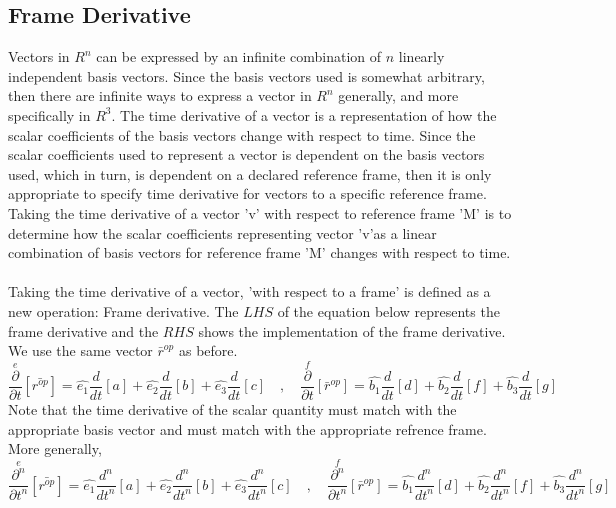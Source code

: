 \documentclass[class=report, 12pt, crop=false]{standalone}
\begin{document}
\begin{center}
\section{Frame Derivative}
\begin{comment}
\end{comment}
Vectors in $R^{n}$ can be expressed by an infinite combination of $n$ linearly independent basis vectors. Since the basis vectors used is somewhat arbitrary, then there are infinite ways to express a vector in $R^{n}$ generally, and more specifically in $R^{3}$. The time derivative of a vector is a representation of how the scalar coefficients of the basis vectors change with respect to time. Since the scalar coefficients used to represent a vector is dependent on the basis vectors used, which in turn, is dependent on a declared reference frame, then it is only appropriate to specify time derivative for vectors to a specific reference frame. Taking the time derivative of a vector 'v' with respect to reference frame 'M' is to determine how the scalar coefficients representing vector 'v'as a linear combination of basis vectors for reference frame 'M' changes with respect to time.
\\~\\Taking the time derivative of a vector, 'with respect to a frame' is defined as a new operation: Frame derivative. The $LHS$ of the equation below represents the frame derivative and the $RHS$ shows the implementation of the frame derivative. We use the same vector $\bar{r}^{op}$ as before.
$$\overset{e}{\frac{\partial}{\partial t}}[\bar{{r}^{op}}] = \hat{e_{1}}\frac{d}{d t}[a] + \hat{e_{2}}\frac{d}{d t}[b] + \hat{e_{3}}\frac{d}{d t}[c] \quad,\quad \overset{f}{\frac{\partial}{\partial t}}[\bar{r}^{op}] = \hat{b_{1}}\frac{d}{d t}[d] + \hat{b_{2}}\frac{d}{d t}[f] + \hat{b_{3}}\frac{d}{d t}[g]$$
Note that the time derivative of the scalar quantity must match with the appropriate basis vector and must match with the appropriate refrence frame. More generally,
$$\overset{e}{\frac{\partial^n}{\partial t^n}}[\bar{{r}^{op}}] = \hat{e_{1}}\frac{d^n}{d t^n}[a] + \hat{e_{2}}\frac{d^n}{d t^n}[b] + \hat{e_{3}}\frac{d^n}{d t^n}[c] \quad,\quad \overset{f}{\frac{\partial^n}{\partial t^n}}[\bar{r}^{op}] = \hat{b_{1}}\frac{d^n}{d t^n}[d] + \hat{b_{2}}\frac{d^n}{d t^n}[f] + \hat{b_{3}}\frac{d^n}{d t^n}[g]$$





\end{center}
\end{document}
